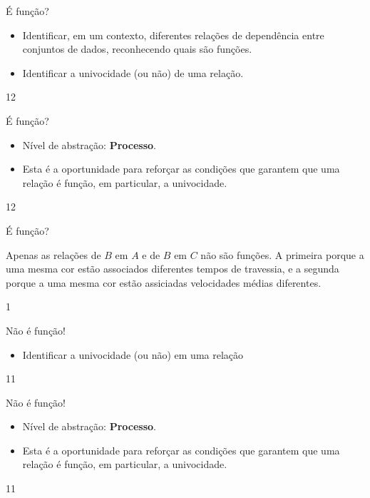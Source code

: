 \begin{objectives}{É função?}
{
\begin{itemize}

\item Identificar, em um contexto, diferentes relações de dependência entre conjuntos de dados, reconhecendo quais são funções.

\item Identificar a univocidade (ou não) de uma relação.

\end{itemize}
}{1}{2}
\end{objectives}
\begin{sugestions}{É função?}
{
\begin{itemize}
\item Nível de abstração: \textbf{Processo}.

\item Esta é a oportunidade para reforçar as condições que garantem que uma relação é função, em particular, a univocidade.
\end{itemize}
}{1}{2}
\end{sugestions}
\begin{answer}{É função?}
{
Apenas as relações de $B$ em $A$ e de $B$ em $C$ não são funções. A primeira porque a uma mesma cor estão associados diferentes tempos de travessia, e a segunda porque a uma mesma cor estão assiciadas velocidades médias diferentes.

}{1}
\end{answer}
\clearmargin
\begin{objectives}{Não é função!}
{
\begin{itemize}

\item Identificar a univocidade (ou não) em uma relação

\end{itemize}
}{1}{1}
\end{objectives}
\begin{sugestions}{Não é função!}
{
\begin{itemize}
\item Nível de abstração: \textbf{Processo}.

\item Esta é a oportunidade para reforçar as condições que garantem que uma relação é função, em particular, a univocidade.
\end{itemize}
}{1}{1}
\end{sugestions}
